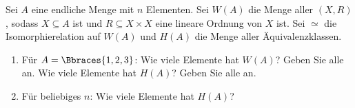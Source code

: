 
\begin{exercise}[281]

Sei $A$ eine endliche Menge mit $n$ Elementen. Sei $W(A)$ die Menge aller $(X, R)$, sodass $X \subseteq A$ ist und $R \subseteq X \times X$ eine lineare Ordnung von $X$ ist.
Sei $\simeq$ die Isomorphierelation auf $W(A)$ und $H(A)$ die Menge aller Äquivalenzklassen.

\begin{enumerate}[label = \alph*.]

  \item Für $A = \Bbraces{1, 2, 3}$:
  Wie viele Elemente hat $W(A)$?
  Geben Sie alle an.
  Wie viele Elemente hat $H(A)$?
  Geben Sie alle an.

  \item Für beliebiges $n$:
  Wie viele Elemente hat $H(A)$?

\end{enumerate}

\end{exercise}


